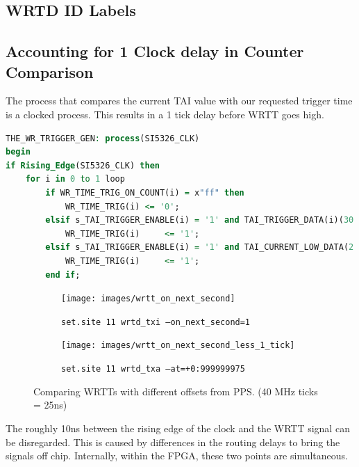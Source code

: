 \documentclass[]{article}
\begin{document}


\subsection{WRTD ID Labels}

\subsection{Accounting for 1 Clock delay in Counter Comparison}

The process that compares the current TAI value with our requested trigger time is a clocked process. This results in a 1 tick delay before WRTT goes high.

\begin{lstlisting}[language=vhdl,style=hdlstyle]
THE_WR_TRIGGER_GEN: process(SI5326_CLK)
begin
if Rising_Edge(SI5326_CLK) then
	for i in 0 to 1 loop
		if WR_TIME_TRIG_ON_COUNT(i) = x"ff" then
			WR_TIME_TRIG(i) <= '0';
		elsif s_TAI_TRIGGER_ENABLE(i) = '1' and TAI_TRIGGER_DATA(i)(30 downto 0) = "111" & x"fffffff" then -- Make this a constant... For "instant" trigger support
			WR_TIME_TRIG(i) 	<= '1';
		elsif s_TAI_TRIGGER_ENABLE(i) = '1' and TAI_CURRENT_LOW_DATA(2 downto 0) = TAI_TRIGGER_DATA(i)(30 downto 28)  and SI5326_COUNTER =  TAI_TRIGGER_DATA(i)(27 downto 0) then
			WR_TIME_TRIG(i) 	<= '1';
		end if;
\end{lstlisting}

\begin{figure}[H]
	\begin{subfigure}{0.5\textwidth}
		\texttt{[image: images/wrtt\_on\_next\_second]}
		\caption{\texttt{set.site 11 wrtd\_txi --on\_next\_second=1}}
	\end{subfigure}
	\begin{subfigure}{0.5\textwidth}
		\texttt{[image: images/wrtt\_on\_next\_second\_less\_1\_tick]}
		\caption{\texttt{set.site 11 wrtd\_txa --at=+0:999999975}}
	\end{subfigure}
	
	\caption{Comparing WRTTs with different offsets from PPS. (40 MHz ticks = 25ns)}
	\label{wrtt_vs_pps}
\end{figure}

The roughly 10ns between the rising edge of the clock and the WRTT signal can be disregarded. This is caused by differences in the routing delays to bring the signals off chip. Internally, within the FPGA, these two points are simultaneous.\\
\end{document}
